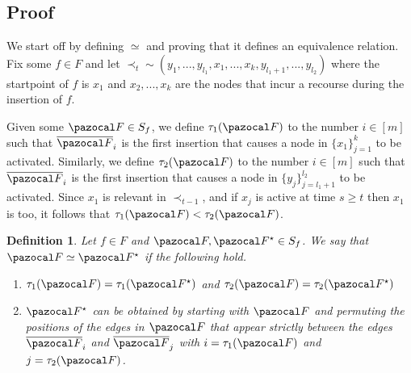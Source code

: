 \documentclass{report}
\newtheorem{definition}{Definition}
\DeclareMathOperator*{\polylog}{polylog}
\begin{document}


\subsection{Proof}

We start off by defining $\simeq$ and proving that it defines an equivalence relation. Fix some $f \in F$ and let $\prec_t \sim (y_1,...,y_{l_1},x_1,...,x_k,y_{l_1+1},...,y_{l_2})$ where the startpoint of $f$ is $x_1$ and $x_2,...,x_k$ are the nodes that incur a recourse during the insertion of $f$.

Given some $\pazocal F \in S_f$, we define $\tau_1(\pazocal F)$ to the number $i \in [m]$ such that $\overline{\pazocal F}_i$ is the first insertion that causes a node in $\{x_1\}_{j=1}^{k}$ to be activated. Similarly, we define $\tau_2(\pazocal F)$ to the number $i \in [m]$ such that $\overline{\pazocal F}_i$ is the first insertion that causes a node in $\{y_j\}_{j=l_1+1}^{l_2}$ to be activated. Since $x_1$ is relevant in $\prec_{t-1}$, and if $x_j$ is active at time $s \geq t$ then $x_1$ is too, it follows that $\tau_1(\pazocal F) < \tau_2(\pazocal F)$.

\begin{definition}
Let $f \in F$ and $\pazocal F, \pazocal F^\star \in S_f$. We say that $\pazocal F \simeq \pazocal F^\star$ if the following hold.

\begin{enumerate}
    \item $\tau_1(\pazocal F) = \tau_1(\pazocal F^\star)$ and $\tau_2(\pazocal F) = \tau_2(\pazocal F^\star)$
    \item $\pazocal F^\star$ can be obtained by starting with $\pazocal F$ and permuting the positions of the edges in $\pazocal F$ that appear strictly between the edges $\overline{\pazocal F}_i$ and $\overline{\pazocal F}_j$ with $i=\tau_1(\pazocal F)$ and $j=\tau_2(\pazocal F)$.
\end{enumerate}
\end{definition}
\end{document}
